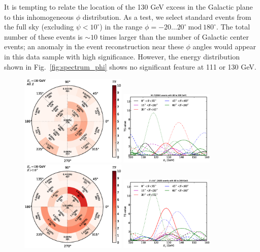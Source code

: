 \documentclass[aps,twocolumn,prd,superscriptaddress,showpacs,nofootinbib,fixfloat]{revtex4}
\begin{document}
It is tempting to relate the location of the 130 GeV excess
in the Galactic plane to this inhomogeneous $\phi$
distribution. As a test, we select standard events from the
full sky (excluding $\psi < 10^\circ$) in the range $\phi=
-20\dots20^\circ\ \text{mod}\ 180^\circ$. The total number
of these events is $\sim10$ times larger than the number of
Galactic center events; an anomaly in the event
reconstruction near these $\phi$ angles would appear in
this data sample with high significance.  However, the
energy distribution shown in Fig.~\ref{fig:spectrum_phi}
shows no significant feature at 111 or 130 GeV.

\begin{figure}
  \centering
  \includegraphics[width=0.45\textwidth]{plots/polar_all.eps}
  \includegraphics[width=0.40\textwidth]{plots/scan_all.eps}
  \includegraphics[width=0.45\textwidth]{plots/polar_z.GT.110.eps}
  \includegraphics[width=0.40\textwidth]{plots/scan_z.GT.110.eps}

\end{figure}
\end{document}
